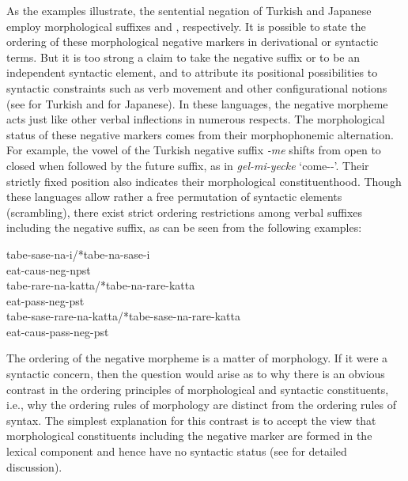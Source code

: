 \documentclass[output=paper]{langsci/langscibook}
\begin{document}
\noindent
As the examples illustrate, the sentential negation of Turkish and Japanese employ
morphological suffixes   and ,
respectively.
It is possible to state the ordering
of these morphological negative markers in derivational
or syntactic terms. But it is too strong a claim to
take the negative suffix  or   to be an independent syntactic element,
and to attribute its positional possibilities to syntactic constraints
such as verb movement and other configurational notions (see \citet{kelepir} for
Turkish and \citet{Kato:97,Kato:00} for Japanese).
%
In these languages, the negative morpheme acts just like
other verbal inflections in numerous respects.
%
%
%
%
%
The morphological status of
these negative markers comes from their morphophonemic alternation.
For example, the vowel of the Turkish negative suffix {\it -me} shifts from open to closed when followed by the
future suffix, as in {\it gel-mi-yecke} `come-\NEG-\FUT'.  Their
strictly fixed position also indicates their morphological
constituenthood. Though these languages allow rather a free permutation of
syntactic elements (scrambling), there exist strict ordering restrictions among
verbal suffixes including the negative suffix, as can be seen from
the following examples:




\begin{exe}
\ex \begin{xlist}
\ex
\gll tabe-sase-na-i/*tabe-na-sase-i \\
eat-{\sc caus}-{\sc neg}-{\sc npst} \\

\ex
\gll tabe-rare-na-katta/*tabe-na-rare-katta \\
eat-{\sc pass}-{\sc neg}-{\sc pst} \\

\ex
\gll tabe-sase-rare-na-katta/*tabe-sase-na-rare-katta \\
eat-{\sc caus}-{\sc pass}-{\sc neg}-{\sc pst} \\

\end{xlist}\end{exe}

\noindent
The ordering of the negative morpheme is a matter of morphology.
If it were a syntactic concern, then
the question would arise as to why
there is an obvious contrast in the ordering principles
of morphological and syntactic constituents, i.e., why the ordering
rules of morphology are distinct from the ordering rules of syntax. The
simplest explanation for this contrast is to accept
the view that morphological constituents including the negative marker
are formed in the lexical component and hence have no syntactic
status (see \citet{Kim:00} for detailed discussion).
\end{document}
